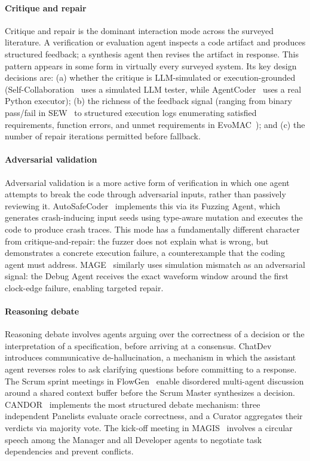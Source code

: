 \documentclass{llmxive}
\begin{document}
\paragraph{Critique and repair} Critique and repair is the
dominant interaction mode across the surveyed literature. A
verification or evaluation agent inspects a code artifact and
produces structured feedback; a synthesis agent then revises the
artifact in response. This pattern appears in some form in
virtually every surveyed system. Its key design decisions are:
(a) whether the critique is LLM-simulated or execution-grounded
(Self-Collaboration~\cite{Dong2024SelfCollaboration} uses a
simulated LLM tester, while
AgentCoder~\cite{huang2023agentcoder} uses a real Python
executor); (b) the richness of the feedback signal (ranging from
binary pass/fail in SEW~\cite{Liu2025SEW} to structured execution
logs enumerating satisfied requirements, function errors, and
unmet requirements in EvoMAC~\cite{Hu2025EvoMAC}); and (c) the
number of repair iterations permitted before fallback.

\paragraph{Adversarial validation} Adversarial validation is a
more active form of verification in which one agent attempts to
break the code through adversarial inputs, rather than passively
reviewing it. AutoSafeCoder~\cite{Nunez2024AutoSafeCoder}
implements this via its Fuzzing Agent, which generates
crash-inducing input seeds using type-aware mutation and executes
the code to produce crash traces. This mode has a fundamentally
different character from critique-and-repair: the fuzzer does not
explain what is wrong, but demonstrates a concrete execution
failure, a counterexample that the coding agent must address.
MAGE~\cite{Zhao2024MAGE} similarly uses simulation mismatch as an
adversarial signal: the Debug Agent receives the exact waveform
window around the first clock-edge failure, enabling targeted
repair.

\paragraph{Reasoning debate} Reasoning debate involves agents
arguing over the correctness of a decision or the interpretation
of a specification, before arriving at a consensus.
ChatDev~\cite{Qian2023ChatDev} introduces communicative
de-hallucination, a mechanism in which the assistant agent
reverses roles to ask clarifying questions before committing to a
response. The Scrum sprint meetings in
FlowGen~\cite{Lin2025Soen101} enable disordered multi-agent
discussion around a shared context buffer before the Scrum Master
synthesizes a decision. CANDOR~\cite{Xu2025Hallucination}
implements the most structured debate mechanism: three
independent Panelists evaluate oracle correctness, and a Curator
aggregates their verdicts via majority vote. The kick-off meeting
in MAGIS~\cite{Tao2024Magis} involves a circular speech among the
Manager and all Developer agents to negotiate task dependencies
and prevent conflicts.
\end{document}

